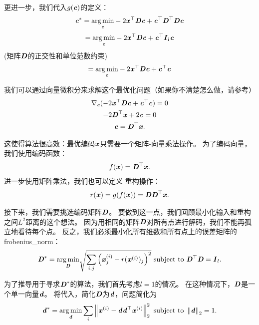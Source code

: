 
更进一步，我们代入$g(\Vc)$的定义：
\begin{equation}
    \Vc^* = \underset{\Vc}{\arg\min} - 2\Vx^\top\MD\Vc + \Vc^\top\MD^\top\MD\Vc
\end{equation}
\begin{equation}
    = \underset{\Vc}{\arg\min} -2\Vx^\top\MD\Vc + \Vc^\top\MI_l\Vc
\end{equation}
(矩阵$\MD$的正交性和单位范数约束)
\begin{equation}
    = \underset{\Vc}{\arg\min} -2\Vx^\top\MD\Vc + \Vc^\top\Vc
\end{equation}


我们可以通过向量微积分来求解这个最优化问题（如果你不清楚怎么做，请参考）
\begin{gather}
    \nabla_{\Vc} (-2\Vx^\top \MD \Vc + \Vc^\top\Vc) = 0\\
    -2\MD^\top\Vx + 2\Vc = 0\\
    \Vc = \MD^\top \Vx.
\end{gather}


这使得算法很高效：最优编码$\Vx$只需要一个矩阵-向量乘法操作。
为了编码向量，我们使用编码函数：
\begin{equation}
    f(\Vx)=\MD^\top\Vx.
\end{equation}
进一步使用矩阵乘法，我们也可以定义\,\,重构操作：
\begin{equation}
    r(\Vx)=g(f(\Vx)) = \MD\MD^\top \Vx.
\label{eq:2.67}
\end{equation}


接下来，我们需要挑选编码矩阵$\MD$。
要做到这一点，我们回顾最小化输入和重构之间$L^2$距离的这个想法。
因为用相同的矩阵$\MD$对所有点进行解码，我们不能再孤立地看待每个点。
反之，我们必须最小化所有维数和所有点上的误差矩阵的\,\gls{frobenius_norm}：
\begin{equation}
    \MD^* =  \underset{\MD}{\arg\min} \sqrt{\sum_{i,j}\left( \Vx_j^{(i)} - r(\Vx^{(i)})_j\right)^2} \text{ subject to } \MD^\top\MD = \MI_l.
\label{eq:2.68}
\end{equation}

为了推导用于寻求$\MD^*$的算法，我们首先考虑$l=1$的情况。
在这种情况下，$\MD$是一个单一向量$\Vd$。
将代入，简化$\MD$为$\Vd$，问题简化为
\begin{equation}
    \Vd^* = \underset{\Vd}{\arg\min} \sum_i \norm{\Vx^{(i)} - \Vd\Vd^\top \Vx^{(i)}}_2^2
    \text{ subject to } \norm{\Vd}_2 = 1.
\end{equation}

